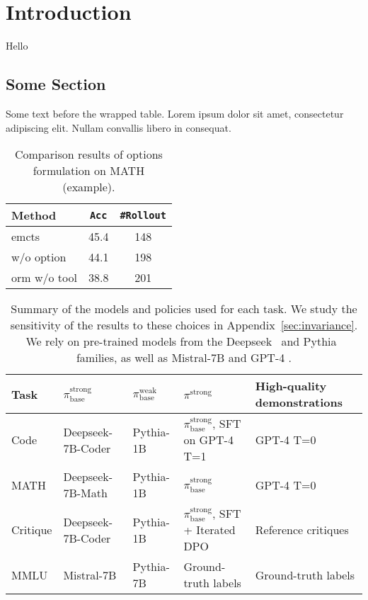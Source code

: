 \documentclass{article}
\begin{document}
\section{Introduction}
\label{sec:intro}
Hello

\subsection{Some Section}
Some text before the wrapped table.
Lorem ipsum dolor sit amet, consectetur adipiscing elit. Nullam convallis libero in consequat.

\begin{table}[htb]
\label{tab:option_critic_example}
\centering %
\begin{tabular}{lcc}
\toprule
Method & \texttt{Acc} & \texttt{\#Rollout} \\
\midrule
emcts & 45.4 & 148 \\
w/o option & 44.1 & 198 \\
orm w/o tool  & 38.8 & 201 \\
\bottomrule
\end{tabular}
\caption{Comparison results of options formulation on MATH (example).}
\end{table}

\begin{table}[t]
    \centering
    \small
    \begin{tabular}{lllll}
    \toprule
         Task & $\pi^\text{strong}_\text{base}$ & $\pi^\text{weak}_\text{base}$ & $\pi^\text{strong}$ & High-quality demonstrations \\
         \midrule
         Code  & Deepseek-7B-Coder & Pythia-1B & $\pi^\text{strong}_\text{base}$, SFT on GPT-4 T=1 & GPT-4 T=0 \\
         MATH & Deepseek-7B-Math & Pythia-1B & $\pi^\text{strong}_\text{base}$ & GPT-4 T=0 \\
         Critique & Deepseek-7B-Coder & Pythia-1B & $\pi^\text{strong}_\text{base}$, SFT + Iterated DPO & Reference critiques \\
         MMLU & Mistral-7B & Pythia-7B & Ground-truth labels & Ground-truth labels \\ \bottomrule
    \end{tabular}
    \vspace{2mm}
    \caption{
        Summary of the models and policies used for each task. We
        study the sensitivity of the results to these choices in Appendix~\ref{sec:invariance}. 
        We rely on pre-trained models from the Deepseek~\citep{bi2024deepseek, shao2024deepseekmath} and Pythia~\citep{biderman2023pythia} families, as well as Mistral-7B \citep{jiang2023mistral} and GPT-4 \citep{openai2023gpt}.
    }
    \label{tab:demos}
\end{table}
\end{document}
